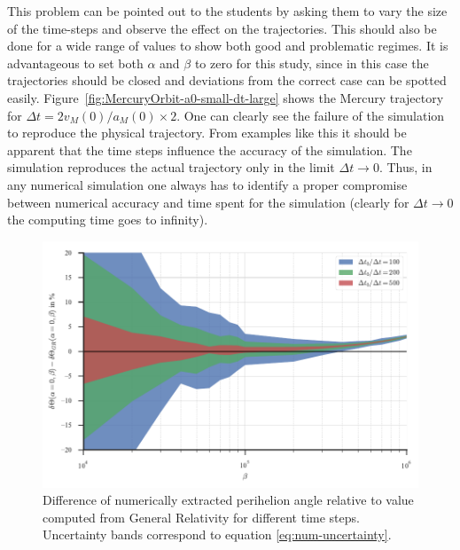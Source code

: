 \documentclass[12pt,ngerman,american]{iopart}
\begin{document}
This problem can be pointed out to the students by asking them to vary the size of the time-steps and observe the effect on the trajectories.
This should also be done for a wide range of values to show both good and problematic regimes.
It is advantageous to set both $\alpha$ and $\beta$ to zero for this study, since in this case the trajectories should be closed and deviations from the correct case can be spotted easily.
Figure~\ref{fig:MercuryOrbit-a0-small-dt-large} shows the Mercury trajectory for $\Delta t=2 v_M(0) /a_M(0) \times 2$.
One can clearly see the failure of the simulation to reproduce the physical trajectory.
From examples like this it should be apparent that the time steps influence the accuracy of the simulation.
The simulation reproduces the actual trajectory only in the limit $\Delta t \rightarrow 0$. Thus, in any numerical simulation
one always has to identify a proper compromise between numerical accuracy and time spent for the simulation
(clearly for $\Delta t\to 0$ the computing time goes to infinity).


\begin{figure}[htb]
	\centering
	\includegraphics[width=.99\textwidth]{figs/computation-precision.pdf}
	\caption{\label{fcc4}Difference of numerically extracted perihelion angle relative to value computed from General Relativity for different time steps.  Uncertainty bands correspond to equation \ref{eq:num-uncertainty}.
}
\end{figure}
\end{document}
